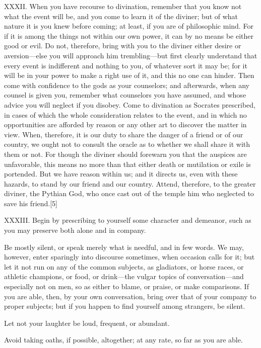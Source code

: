 \documentclass[a4paper]{article}
\begin{document}
XXXII. When you have recourse to divination, remember that you know not what the
event will be, and you come to learn it of the diviner; but of what
nature it is you knew before coming; at least, if you are of philosophic
mind. For if it is among the things not within our own power, it can by
no means be either good or evil. Do not, therefore, bring with you to the
diviner either desire or aversion—else you will approach him
trembling—but first clearly understand that every event is indifferent
and nothing to you, of whatever sort it may be; for it will be in your
power to make a right use of it, and this no one can hinder. Then come
with confidence to the gods as your counselors; and afterwards, when any
counsel is given you, remember what counselors you have assumed, and
whose advice you will neglect if you disobey. Come to divination as
Socrates prescribed, in cases of which the whole consideration relates to
the event, and in which no opportunities are afforded by reason or any
other art to discover the matter in view. When, therefore, it is our duty
to share the danger of a friend or of our country, we ought not to
consult the oracle as to whether we shall share it with them or not. For
though the diviner should forewarn you that the auspices are unfavorable,
this means no more than that either death or mutilation or exile is
portended. But we have reason within us; and it directs us, even with
these hazards, to stand by our friend and our country. Attend, therefore,
to the greater diviner, the Pythian God, who once cast out of the temple
him who neglected to save his friend.[5]


XXXIII. Begin by prescribing to yourself some character and demeanor, such as you
may preserve both alone and in company.

Be mostly silent, or speak merely what is needful, and in few words. We
may, however, enter sparingly into discourse sometimes, when occasion
calls for it; but let it not run on any of the common subjects, as
gladiators, or horse races, or athletic champions, or food, or drink—the
vulgar topics of conversation—and especially not on men, so as either to
blame, or praise, or make comparisons. If you are able, then, by your own
conversation, bring over that of your company to proper subjects; but if
you happen to find yourself among strangers, be silent.

Let not your laughter be loud, frequent, or abundant.

Avoid taking oaths, if possible, altogether; at any rate, so far as you
are able.
\end{document}
